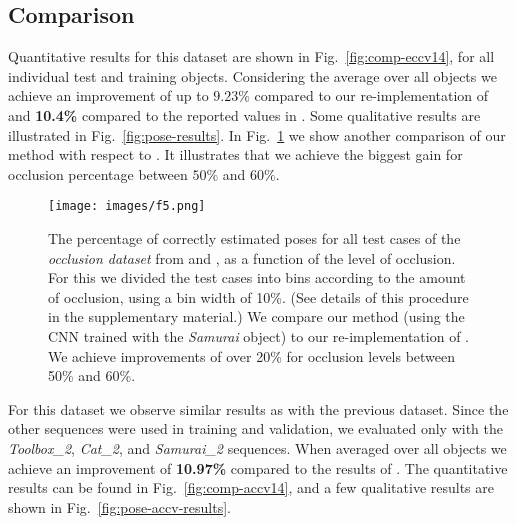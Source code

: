 \documentclass[10pt,letterpaper]{article}
\newcommand{\etal}{\mbox{\emph{et al.\ }}}
\begin{document}
\subsection{Comparison}

Quantitative results for this dataset are shown in Fig.~\ref{fig:comp-eccv14}, for all individual test and training objects. Considering the average over all objects we achieve an improvement of up to ${9.23\%}$ compared to our re-implementation of \cite{brachmann2014} and {\bf 10.4\%} compared to the reported values in \cite{brachmann2014}. Some qualitative results are illustrated in Fig.~\ref{fig:pose-results}. In Fig.~\ref{fig:comp-occlusion-eccv14} we show another comparison of our method with respect to \cite{brachmann2014}. It illustrates that we achieve the biggest gain for occlusion percentage between $50\%$ and $60\%$. 

\begin{figure}[t]
\begin{center}
\texttt{[image: images/f5.png]}
\end{center}
   \caption{The percentage of correctly estimated poses for all test cases of the \emph{occlusion dataset} from \cite{brachmann2014} and \cite{hinterstoisser2012accv}, as a function of the level of occlusion. For this we divided the test cases into bins according to the amount of occlusion, using a bin width of 10\%. (See details of this procedure in the supplementary material.) We compare our method (using the CNN trained with the \emph{Samurai} object) to our re-implementation of \cite{brachmann2014}. We achieve improvements of over 20\% for occlusion levels between 50\% and 60\%.}
\label{fig:comp-occlusion-eccv14}
\end{figure}

\noindent{\bf Dataset of Krull \etal}
For this dataset we observe similar results as with the previous dataset. Since the other sequences were used in training and validation, we evaluated only with the \emph{Toolbox\_2}, \emph{Cat\_2}, and \emph{Samurai\_2} sequences. When averaged over all objects we achieve an improvement of {\bf 10.97\%} compared to the results of \cite{brachmann2014}. The quantitative results can be found in Fig.~\ref{fig:comp-accv14}, and a few qualitative results are shown in Fig.~\ref{fig:pose-accv-results}. 
\end{document}
